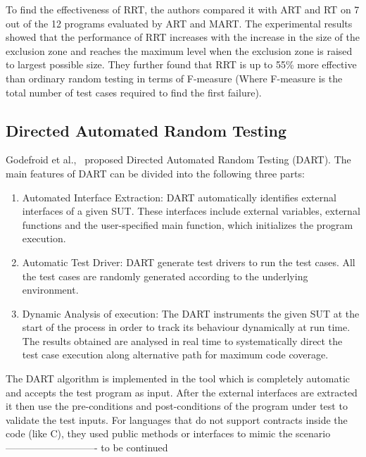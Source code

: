 To find the effectiveness of RRT, the authors compared it with ART and RT on 7 out of the 12 programs evaluated by ART and MART. The experimental results showed that the performance of RRT increases with the increase in the size of the exclusion zone and reaches the maximum level when the exclusion zone is raised to largest possible size. %
They further found that RRT is up to 55\% more effective than ordinary random testing in terms of F-measure (Where F-measure is the total number of test cases required to find the first failure).



\subsection{Directed Automated Random Testing}
Godefroid et al.,~\cite{Godefroid2005} proposed Directed Automated Random Testing (DART). %
The main features of DART can be divided into the following three parts:
\begin{enumerate}
\item Automated Interface Extraction: DART automatically identifies external interfaces of a given SUT. These interfaces include external variables, external functions and the user-specified main function, which initializes the program execution.
\item Automatic Test Driver: DART generate test drivers to run the test cases. All the test cases are randomly generated according to the underlying environment.
\item Dynamic Analysis of execution: The DART instruments the given SUT at the start of the process in order to track its behaviour dynamically at run time. The results obtained are analysed in real time to systematically direct the test case execution along alternative path for maximum code coverage.
\end{enumerate}

The DART algorithm is implemented in the tool which is completely automatic and accepts the test program as input. After the external interfaces are extracted it then use the pre-conditions and post-conditions of the program under test to validate the test inputs. For languages that do not support contracts inside the code (like C), they used public methods or interfaces to mimic the scenario —————————- to be continued

